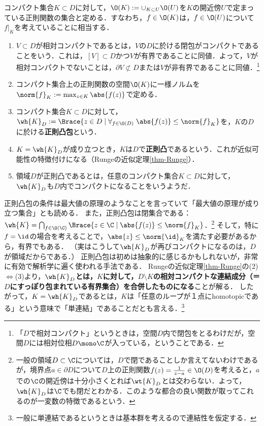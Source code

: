 \documentclass[uplatex, dvipdfmx]{jsreport}
\begin{document}
\begin{notation}[コンパクト集合上の正則関数]
    コンパクト集合$K\subset D$に対して，$\O(K):=\cup_{K\subset U}\O(U)$を$K$の開近傍$U$で定まっている正則関数の集合と定める．すなわち，$f\in\O(K)$は，$f\in\O(U)$について$f|_K$を考えていることに相当する．
\end{notation}

\begin{definition}\mbox{}
    \begin{enumerate}
        \item $V\subset D$が相対コンパクトであるとは，$V$の$D$に於ける閉包がコンパクトであることをいう．これは，$[V]\subset D$かつ$V$が有界であることに同値．よって，$V$が相対コンパクトでないことは，$\partial V\not\subset D$または$V$が非有界であることに同値．\footnote{「$D$で相対コンパクト」というときは，空間$D$内で閉包をとるわけだが，空間$D$には相対位相$D\mono\C$が入っている，ということである．}
        \item コンパクト集合上の正則関数の空間$\O(K)$に一様ノルムを$\norm{f}_K:=\max_{z\in K}\abs{f(z)}$で定める．
        \item コンパクト集合$K\subset D$に対して，$\wh{K}_D:=\Brace{z\in D\mid\forall_{f\in\O(D)}\;\abs{f(z)}\le\norm{f}_K}$を，$K$の$D$に於ける\textbf{正則凸包}という．
        \item $K=\wh{K}_D$が成り立つとき，$K$は$D$で\textbf{正則凸}であるという．これが近似可能性の特徴付けになる（Rungeの近似定理\ref{thm-Runge}）．
        \item 領域$D$が正則凸であるとは，任意のコンパクト集合$K\subset D$に対して，$\wh{K}_D$も$D$内でコンパクトになることをいうようだ．
    \end{enumerate}
\end{definition}
\begin{remarks}[正則凸包とは？]\label{remarks-convex-hull}
    正則凸包の条件は最大値の原理のようなことを言っていて「最大値の原理が成り立つ集合」とも読める．
    また，正則凸包は閉集合である：$\wh{K}=\bigcap_{f\in\O(\C)}\Brace{z\in\C\mid\abs{f(z)}\le\norm{f}_K}$．\footnote{一般の領域$D\subset\C$については，$D$で閉であることしか言えてないわけであるが，境界点$a\in\partial D$について$D$上の正則関数$f(z)=\frac{1}{z-a}\in\O(D)$を考えると，$a$での$\C$の開近傍は十分小さくとれば$\wt{K}_D$とは交わらない．よって，$\wh{K}_D$は$\C$でも閉だとわかる．このような都合の良い関数が取ってこれるのが一変数の特徴であるという．}
    そして，特に$f=\id$の場合を考えることで，$\abs{z}\le\norm{\id}_K$を満たす必要があるから，有界でもある．
    （実はこうして$\wh{K}_D$が再びコンパクトになるのは，$D$が領域だからである．）
    正則凸包は初めは抽象的に感じるかもしれないが，非常に有効で解析学に遍く使われる手法である．
    Rungeの近似定理\ref{thm-Runge}の(2)$\Leftrightarrow$(3)より，\textbf{$\wh{K}_D$とは，$K$に対して，$D\setminus K$の相対コンパクトな連結成分（＝$D$にすっぽり包まれている有界集合）を合併したものになる}ことが解る．
    したがって，$K=\wh{K}_D$であるとは，$K$は「任意のループが１点にhomotopicである」という意味で「単連結」であることだとも言える．\footnote{一般に単連結であるというときは基本群を考えるので連結性を仮定する．}
\end{remarks}
\end{document}
